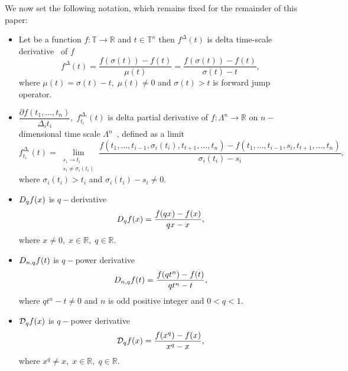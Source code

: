We now set the following notation, which remains fixed for the remainder of this paper:
\begin{itemize}
    \setlength\itemsep{1em}
    \item Let be a function $f\colon \mathbb{T} \to \mathbb{R}$ and $t\in\mathbb{T}^{\kappa}$ then $f^{\Delta}(t)$
    is delta time-scale derivative~\cite{Bohner2001DynamicEO} of $f$
    \[
        f^{\Delta} (t) = \frac{f(\sigma(t)) - f(t)}{\mu(t)} = \frac{f(\sigma(t)) - f(t)}{\sigma(t) - t},
    \]
    where $\mu(t) = \sigma(t) - t, \; \mu(t) \neq 0$ and $\sigma(t) > t$ is forward jump operator.

    \item $\dfrac{\partial f(t_1,\ldots,t_n)}{\Delta_i t_i}, \; f^{\Delta_i}_{t_i}(t)$ is delta partial derivative
    of $f\colon \Lambda^n \to \mathbb{R}$ on $n-$dimensional time scale
    $\Lambda^n$~\cite{bohner2004partial, ahlbrandt2002partial,JACKSON2006391},
    defined as a limit
    \[
        f^{\Delta_i}_{t_i}(t) = \lim \limits_{\substack{s_i \to t_i \\ s_i \neq \sigma_i(t_i)}}
        \frac{
            f(t_1, \ldots, t_{i-1}, \sigma_i(t_i), t_{t+1}, \ldots, t_n)
            - f(t_1, \ldots, t_{i-1}, s_i, t_{t+1}, \ldots, t_n)
        }{\sigma_i(t_i) - s_i},
    \]
    where $\sigma_i(t_i) > t_i$ and $\sigma_i(t_i) - s_i \neq 0$.

    \item $D_{q} f(x)$ is $q-$derivative~\cite{jackson_1909,ernst2000history,ernst2008different,kac2001quantum}
    \[
        D_{q} f(x) = \frac{f(qx)-f(x)}{qx-x},
    \]
    where $x\neq 0, \; x\in\mathbb{R}, \; q\in\mathbb{R}$.

    \item $D_{n,q} f(t)$ is $q-$power derivative~\cite{aldwoah2011power}
    \[
        D_{n,q} f(t) = \frac{f(qt^n) - f(t)}{qt^n - t},
    \]
    where $qt^n - t \neq 0$ and $n$ is odd positive integer and $0 < q < 1$.

    \item $\mathcal{D}_q f(x)$ is $q-$power derivative
    \[
        \mathcal{D}_q f(x) = \frac{f(x^q)-f(x)}{x^q-x},
    \]
    where $x^q \neq x, \; x\in\mathbb{R}, \; q\in\mathbb{R}$.


\end{itemize}
